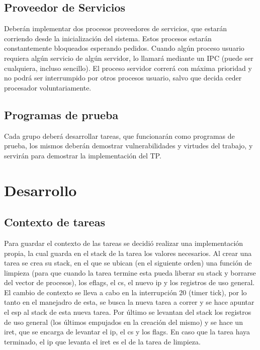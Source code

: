 \documentclass[a4paper,10pt]{article}
\begin{document}
\subsection{Proveedor de Servicios}
Deberán implementar dos procesos proveedores de servicios, que estarán corriendo 
desde la inicialización del sistema. Estos procesos estarán constantemente
bloqueados esperando pedidos. Cuando algún proceso usuario requiera algún
servicio de algún servidor, lo llamará mediante un IPC (puede ser cualquiera,
incluso sencillo). El proceso servidor correrá con máxima prioridad y no podrá
ser interrumpido por otros procesos usuario, salvo que decida ceder procesador
voluntariamente.

\subsection{Programas de prueba}
Cada grupo deberá desarrollar tareas, que funcionarán como programas de
prueba, los mismos deberán demostrar vulnerabilidades y virtudes del trabajo,
y servirán para demostrar la implementación del TP.


\newpage


\section{Desarrollo}

\subsection{Contexto de tareas}
Para guardar el contexto de las tareas se decidió realizar una implementación propia, 
la cual guarda en el stack de la tarea los valores necesarios. Al crear una tarea se crea
su stack, en el que se ubican (en el siguiente orden) una función de limpieza (para que 
cuando la tarea termine esta pueda liberar su stack y borrarse del vector de procesos), 
los eflags, el cs, el nuevo ip y los registros de uso general. \\
El cambio de contexto se lleva a cabo en la interrupción 20 (timer tick), por lo tanto 
en el manejadro de esta, se busca la nueva tarea a correr y se hace apuntar el esp al stack 
de esta nueva tarea. Por último se levantan del stack los registros de uso general (los últimos 
empujados en la creación del mismo) y se hace un iret, que se encarga de levantar el ip, el cs 
y los flags. En caso que la tarea haya terminado, el ip que levanta el iret es el de la tarea 
de limpieza.
\end{document}
